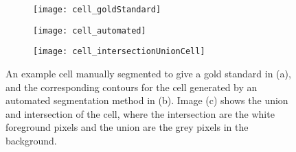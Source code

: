 \begin{figure}[htbp]\centering
	\begin{subfigure}[b]{0.32\linewidth}
		\centering
		\texttt{[image: cell\_goldStandard]}
		\caption{}
		\label{figure:performance_evaluation:cell_gold_standard}
		\vspace{1ex}
	\end{subfigure}
	\begin{subfigure}[b]{0.32\linewidth}
		\centering
		\texttt{[image: cell\_automated]}
		\caption{}
		\label{figure:performance_evaluation:cell_automated}
		\vspace{1ex}
	\end{subfigure}
	\begin{subfigure}[b]{0.32\linewidth}
		\centering
		\texttt{[image: cell\_intersectionUnionCell]}
		\caption{}
		\label{figure:performance_evaluation:cell_intersectionUnionCell}
		\vspace{1ex}
	\end{subfigure}
\caption[Cell: gold standard contours, automated contours, and union and intersection]{An example cell manually segmented to give a gold standard in (a), and the corresponding contours for the cell generated by an automated segmentation method in (b). Image (c) shows the union and intersection of the cell, where the intersection are the white foreground pixels and the union are the grey pixels in the background.}
\label{figure:performance_evaluation:cell}
\end{figure}

